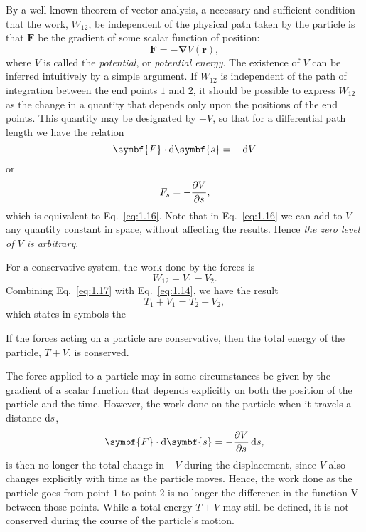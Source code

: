 \label{anchor:1.1} By a well-known theorem of vector analysis, a necessary and sufficient condition that the work, \(W_{12}\), be independent of the physical path taken by the particle is that \(\symbf{F}\) be the gradient of some scalar function of position:
\begin{equation}
    \symbf{F}=-\symbf{\nabla} V\left(\symbf{r}\right),\label{eq:1.16}
\end{equation}
where \(V\) is called the \emph{potential}, or \emph{potential energy}. The existence of \(V\) can be inferred intuitively by a simple argument. If \(W_{12}\) is independent of the path of integration between the end points \(1\) and \(2\), it should be possible to express \(W_{12}\) as the change in a quantity that depends only upon the positions of the end points. This quantity may be designated by \(-V\), so that for a differential path length we have the relation
\begin{equation*}
    \symbf{F}\cdot\odif{\symbf{s}}=-\odif{V}
\end{equation*}
or
\begin{equation*}
    F_s=-\pdv{V}{s},
\end{equation*}
which is equivalent to Eq.~\eqref{eq:1.16}. Note that in Eq.~\eqref{eq:1.16} we can add to \(V\) any quantity constant in space, without affecting the results. Hence \emph{the zero level of \(V\) is arbitrary}.

For a conservative system, the work done by the forces is
\begin{equation}
    W_{12}=V_1-V_2.\label{eq:1.17}
\end{equation}
Combining Eq.~\eqref{eq:1.17} with Eq.~\eqref{eq:1.14}, we have the result
\begin{equation}
    T_1+V_1=T_2+V_2,\label{eq:1.18}
\end{equation}
which states in symbols the
\begin{theorem}
    If the forces acting on a particle are conservative, then the total energy of the particle, \(T+V\), is conserved.
\end{theorem}

The force applied to a particle may in some circumstances be given by the gradient of a scalar function that depends explicitly on both the position of the particle and the time. However, the work done on the particle when it travels a distance \(\odif{s}\),
\begin{equation*}
    \symbf{F}\cdot\odif{\symbf{s}}=-\pdv{V}{s}\odif{s},
\end{equation*}
is then no longer the total change in \(-V\) during the displacement, since \(V\) also changes explicitly with time as the particle moves. Hence, the work done as the particle goes from point \(1\) to point \(2\) is no longer the difference in the function V between those points. While a total energy \(T+V\) may still be defined, it is not conserved during the course of the particle's motion.

